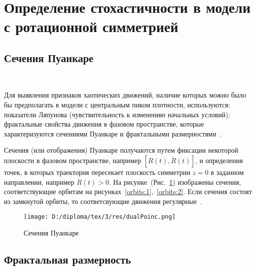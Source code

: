 \section{Определение стохастичности в модели с ротационной симметрией}

\subsection{Сечения Пуанкаре}
~\par
Для выявления признаков хаотических движений, наличие которых можно было бы предполагать в модели с центральным пиком плотности, используются: показатели Ляпунова (чувствительность к изменению начальных условий); фрактальные свойства движения в фазовом пространстве, которые характеризуются сечениями Пуанкаре и фрактальными размерностями~\cite{Mun}.

Сечения (или отображения) Пуанкаре  получаются путем фиксации некоторой плоскости в фазовом пространстве, например $[R(t),\dot{R}(t)]$, и определения точек, в которых траектория пересекает плоскость симметрии $z=0$ в заданном направлении, например $\dot{R}(t)>0$. На рисунке~(Рис.~\ref{poincare}) изображены сечения, соответствующие орбитам на рисунках~\ref{orbits:1},~\ref{orbits:2}. Если сечения состоят из замкнутой орбиты, то соответсвующие движения регулярные~\cite{Mun}.

{
\begin{figure}[H]
\centering
\begin{minipage}[t]{0.8\textwidth}
\centering
\texttt{[image: D:/diploma/tex/3/res/dualPoinc.png]}
\end{minipage}
\caption{Сечения Пуанкаре}\label{poincare}
\end{figure}
}

\subsection{Фрактальная размерность}


